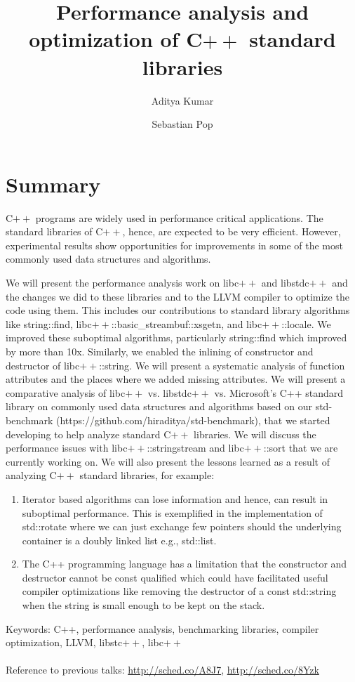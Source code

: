 \documentclass[10pt]{article}
\begin{document}
\title{Performance analysis and optimization of C$++$ standard libraries}

\author[1]{Aditya Kumar}
\author[2]{Sebastian Pop}

\date{}
\maketitle

\section*{Summary}
C$++$ programs are widely used in performance critical applications. The standard
libraries of C$++$, hence, are expected to be very efficient. However,
experimental results show opportunities for improvements in some of the most
commonly used data structures and algorithms.

We will present the performance analysis work on libc$++$ and libstdc$++$ and
the changes we did to these libraries and to the LLVM compiler to optimize the
code using them. This includes our contributions to standard library algorithms
like string::find, libc$++$::basic\_streambuf::xsgetn, and libc$++$::locale. We
improved these suboptimal algorithms, particularly string::find which improved
by more than 10x. Similarly, we enabled the inlining of constructor and
destructor of libc$++$::string. We will present a systematic analysis of
function attributes and the places where we added missing attributes. We will
present a comparative analysis of libc$++$ vs. libstdc$++$ vs. Microsoft's C++
standard library on commonly used data structures and algorithms based on our
std-benchmark (https://github.com/hiraditya/std-benchmark), that we started
developing to help analyze standard C$++$ libraries. We will discuss the
performance issues with libc$++$::stringstream and libc$++$::sort that we are
currently working on. We will also present the lessons learned as a result of
analyzing C$++$ standard libraries, for example:
\begin{enumerate}
\item Iterator based algorithms can lose information and hence, can result in
  suboptimal performance.  This is exemplified in the implementation of
  std::rotate where we can just exchange few pointers should the underlying
  container is a doubly linked list e.g., std::list.
\item The C++ programming language has a limitation that the constructor and
  destructor cannot be const qualified which could have facilitated useful
  compiler optimizations like removing the destructor of a const std::string
  when the string is small enough to be kept on the stack.
\end{enumerate}

Keywords: C++, performance analysis, benchmarking libraries, compiler
optimization, LLVM, libstc$++$, libc$++$
\\
\\
Reference to previous talks: \url{http://sched.co/A8J7}, \url{http://sched.co/8Yzk}
\end{document}
